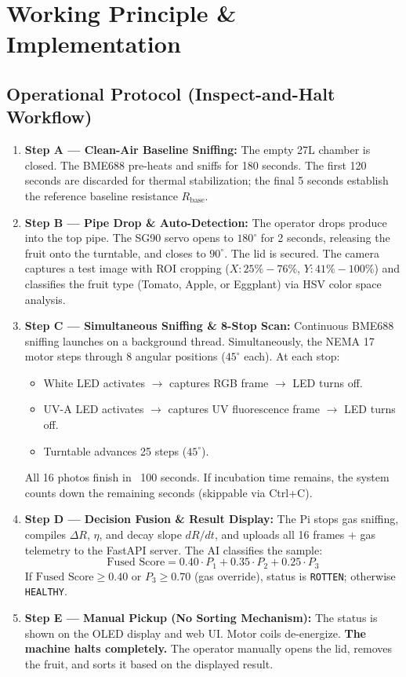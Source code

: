 \documentclass[11pt,a4paper]{article}
\begin{document}
\section{Working Principle \& Implementation}

\subsection{Operational Protocol (Inspect-and-Halt Workflow)}
\begin{enumerate}[leftmargin=*]
    \item \textbf{Step A --- Clean-Air Baseline Sniffing:} The empty 27L chamber is closed. The BME688 pre-heats and sniffs for 180 seconds. The first 120 seconds are discarded for thermal stabilization; the final 5 seconds establish the reference baseline resistance $R_{\text{base}}$.
    \item \textbf{Step B --- Pipe Drop \& Auto-Detection:} The operator drops produce into the top pipe. The SG90 servo opens to $180^\circ$ for 2 seconds, releasing the fruit onto the turntable, and closes to $90^\circ$. The lid is secured. The camera captures a test image with ROI cropping ($X: 25\% - 76\%$, $Y: 41\% - 100\%$) and classifies the fruit type (Tomato, Apple, or Eggplant) via HSV color space analysis.
    \item \textbf{Step C --- Simultaneous Sniffing \& 8-Stop Scan:} Continuous BME688 sniffing launches on a background thread. Simultaneously, the NEMA 17 motor steps through 8 angular positions ($45^\circ$ each). At each stop:
    \begin{itemize}
        \item White LED activates $\to$ captures RGB frame $\to$ LED turns off.
        \item UV-A LED activates $\to$ captures UV fluorescence frame $\to$ LED turns off.
        \item Turntable advances 25 steps ($45^\circ$).
    \end{itemize}
    All 16 photos finish in ~100 seconds. If incubation time remains, the system counts down the remaining seconds (skippable via Ctrl+C).
    \item \textbf{Step D --- Decision Fusion \& Result Display:} The Pi stops gas sniffing, compiles $\Delta R$, $\eta$, and decay slope $dR/dt$, and uploads all 16 frames + gas telemetry to the FastAPI server. The AI classifies the sample:
    \begin{equation}
        \text{Fused Score} = 0.40 \cdot P_1 + 0.35 \cdot P_2 + 0.25 \cdot P_3
    \end{equation}
    If $\text{Fused Score} \ge 0.40$ or $P_3 \ge 0.70$ (gas override), status is \texttt{ROTTEN}; otherwise \texttt{HEALTHY}.
    \item \textbf{Step E --- Manual Pickup (No Sorting Mechanism):} The status is shown on the OLED display and web UI. Motor coils de-energize. \textbf{The machine halts completely.} The operator manually opens the lid, removes the fruit, and sorts it based on the displayed result.
\end{enumerate}
\end{document}

